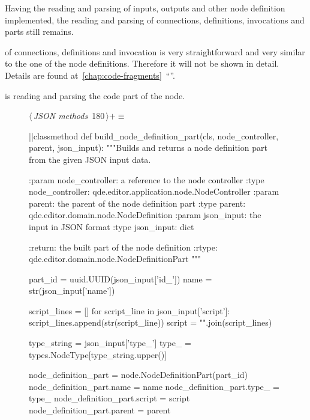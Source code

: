 \documentclass[%
    a4paper,    %
    justified,  %
    nobib,      %
    openany     %
]{tufte-book}
\makeatletter
\renewcommand{\label}[1]{\@tufte@label{##1}}%
\makeatother
\begin{document}
Having the reading and parsing of inputs, outputs and other node definition
implemented, the reading and parsing of connections, definitions, invocations
and parts still remains.

 of connections, definitions and invocation
is very straightforward and very similar to the one of the node definitions.
Therefore it will not be shown in detail. Details are found at~\autoref{chap:code-fragments}~\enquote{}.

 is reading and parsing
the code part of the node.

\begin{figure}[!htbp]
\begin{flushleft} \small
\begin{minipage}{\linewidth}\label{scrap151}\raggedright\small
{} $\langle\,${\itshape JSON methods}\nobreak\ {\footnotesize {180}}$\,\rangle+\equiv$
\vspace{-1ex}
\begin{pythoncode}
|\normalfont{}\fontfamily{}|classmethod
def build_node_definition_part(cls, node_controller, parent, json_input):
    """Builds and returns a node definition part from the given JSON
    input data.

    :param node_controller: a reference to the node controller
    :type  node_controller: qde.editor.application.node.NodeController
    :param parent: the parent of the node definition part
    :type  parent: qde.editor.domain.node.NodeDefinition
    :param json_input: the input in JSON format
    :type  json_input: dict

    :return: the built part of the node definition
    :rtype:  qde.editor.domain.node.NodeDefinitionPart
    """

    part_id         = uuid.UUID(json_input['id_'])
    name            = str(json_input['name'])

    script_lines = []
    for script_line in json_input['script']:
        script_lines.append(str(script_line))
    script = "\n".join(script_lines)

    type_string = json_input['type_']
    type_ = types.NodeType[type_string.upper()]

    node_definition_part = node.NodeDefinitionPart(part_id)
    node_definition_part.name = name
    node_definition_part.type_ = type_
    node_definition_part.script = script
    node_definition_part.parent = parent


\end{pythoncode}
\end{minipage}
\end{flushleft}
\end{figure}
\end{document}
